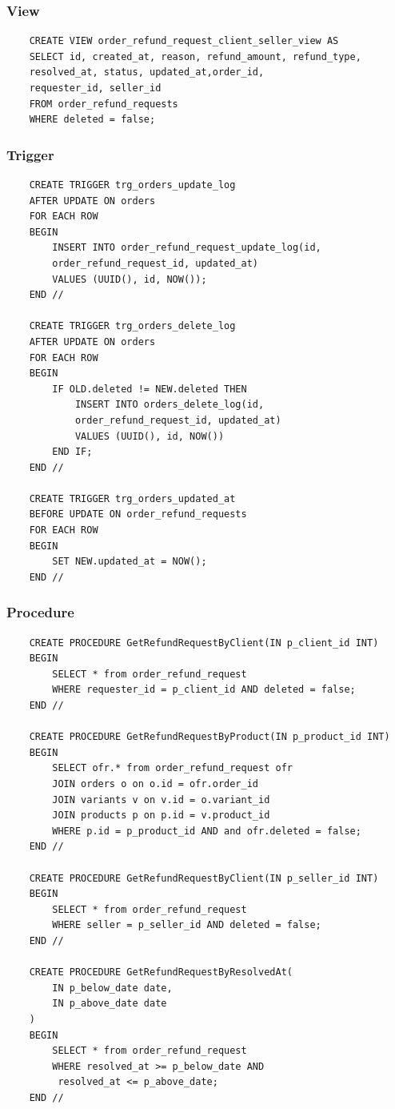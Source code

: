  \subsubsection{View}

 \begin{verbatim}
    CREATE VIEW order_refund_request_client_seller_view AS 
	SELECT id, created_at, reason, refund_amount, refund_type, 
    resolved_at, status, updated_at,order_id,
    requester_id, seller_id 
	FROM order_refund_requests 
	WHERE deleted = false;
 \end{verbatim}

 \subsubsection{Trigger}

 \begin{verbatim}
    CREATE TRIGGER trg_orders_update_log 
    AFTER UPDATE ON orders 
    FOR EACH ROW 
    BEGIN 
        INSERT INTO order_refund_request_update_log(id,
        order_refund_request_id, updated_at) 
        VALUES (UUID(), id, NOW());
    END //

    CREATE TRIGGER trg_orders_delete_log
    AFTER UPDATE ON orders
    FOR EACH ROW
    BEGIN 
        IF OLD.deleted != NEW.deleted THEN 
            INSERT INTO orders_delete_log(id,
            order_refund_request_id, updated_at) 
            VALUES (UUID(), id, NOW())
        END IF;
    END //

    CREATE TRIGGER trg_orders_updated_at
    BEFORE UPDATE ON order_refund_requests
    FOR EACH ROW
    BEGIN
        SET NEW.updated_at = NOW();
    END //
 \end{verbatim}

 \subsubsection{Procedure}

 \begin{verbatim}
    CREATE PROCEDURE GetRefundRequestByClient(IN p_client_id INT) 
    BEGIN 
        SELECT * from order_refund_request 
        WHERE requester_id = p_client_id AND deleted = false;
    END //

    CREATE PROCEDURE GetRefundRequestByProduct(IN p_product_id INT) 
    BEGIN 
        SELECT ofr.* from order_refund_request ofr 
        JOIN orders o on o.id = ofr.order_id
        JOIN variants v on v.id = o.variant_id
        JOIN products p on p.id = v.product_id
        WHERE p.id = p_product_id AND and ofr.deleted = false;
    END //

    CREATE PROCEDURE GetRefundRequestByClient(IN p_seller_id INT) 
    BEGIN 
        SELECT * from order_refund_request 
        WHERE seller = p_seller_id AND deleted = false;
    END //

    CREATE PROCEDURE GetRefundRequestByResolvedAt(
        IN p_below_date date,
        IN p_above_date date
    )
    BEGIN 
        SELECT * from order_refund_request
        WHERE resolved_at >= p_below_date AND
         resolved_at <= p_above_date;
    END //
 \end{verbatim}


